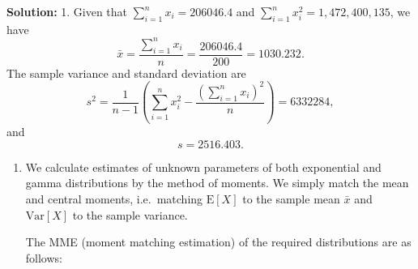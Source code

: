\documentclass[landscape, 20pt]{extreport}
\theoremstyle{definition}
\theoremstyle{definition}
\theoremstyle{definition}
\theoremstyle{definition}
\theoremstyle{remark}
\begin{document}
\textbf{Solution:}
1. Given that \(\sum_{i=1}^n x_i = 206046.4\) and
\(\sum_{i=1}^n x_i^2 = 1,472,400,135\), we have
\[\bar{x} = \frac{\sum_{i=1}^n x_i}{n} = \frac{206046.4}{200} = 1030.232.\]
The sample variance and standard deviation are
\[s^2 = \frac{1}{n-1} \left( \sum_{i=1}^n x_i^2 - \frac{(\sum_{i=1}^n x_i)^2}{n} \right) = 6332284,\]
and \[s = 2516.403.\]

\begin{enumerate}
\def\labelenumi{\arabic{enumi}.}
\setcounter{enumi}{1}
\item
  We calculate estimates of
  unknown parameters of both exponential and gamma distributions by
  the method of moments. We simply match the mean and central moments,
  i.e.~matching \(\mathrm{E}[X]\) to the sample mean \(\bar{x}\) and
  \(\mathrm{Var}[X]\) to the sample variance.

  The MME (moment matching estimation) of the required distributions
  are as follows:


\end{enumerate}
\end{document}
